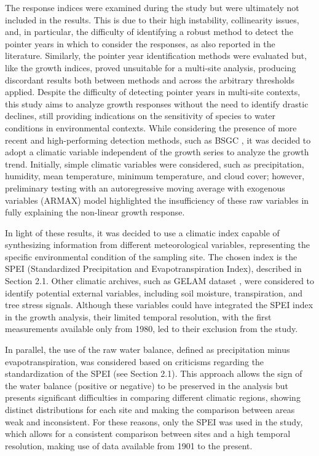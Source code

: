 \documentclass[12pt, a4paper]{article}
\begin{document}
The response indices were examined during the study but were ultimately not included in the results. This is due to their high instability, collinearity issues, and, in particular, the difficulty of identifying a robust method to detect the pointer years in which to consider the responses, as also reported in the literature. Similarly, the pointer year identification methods were evaluated but, like the growth indices, proved unsuitable for a multi-site analysis, producing discordant results both between methods and across the arbitrary thresholds applied. Despite the difficulty of detecting pointer years in multi-site contexts, this study aims to analyze growth responses without the need to identify drastic declines, still providing indications on the sensitivity of species to water conditions in environmental contexts. While considering the presence of more recent and high-performing detection methods, such as BSGC \parencite{buras2022}, it was decided to adopt a climatic variable independent of the growth series to analyze the growth trend. Initially, simple climatic variables were considered, such as precipitation, humidity, mean temperature, minimum temperature, and cloud cover; however, preliminary testing with an autoregressive moving average with exogenous variables (ARMAX) model highlighted the insufficiency of these raw variables in fully explaining the non-linear growth response.

In light of these results, it was decided to use a climatic index capable of synthesizing information from different meteorological variables, representing the specific environmental condition of the sampling site. The chosen index is the SPEI (Standardized Precipitation and Evapotranspiration Index), described in Section 2.1. Other climatic archives, such as GELAM dataset \parencite{miralles2011}, were considered to identify potential external variables, including soil moisture, transpiration, and tree stress signals. Although these variables could have integrated the SPEI index in the growth analysis, their limited temporal resolution, with the first measurements available only from 1980, led to their exclusion from the study.

In parallel, the use of the raw water balance, defined as precipitation minus evapotranspiration, was considered based on criticisms regarding the standardization of the SPEI (see Section 2.1). This approach allows the sign of the water balance (positive or negative) to be preserved in the analysis but presents significant difficulties in comparing different climatic regions, showing distinct distributions for each site and making the comparison between areas weak and inconsistent. For these reasons, only the SPEI was used in the study, which allows for a consistent comparison between sites and a high temporal resolution, making use of data available from 1901 to the present.
\end{document}
